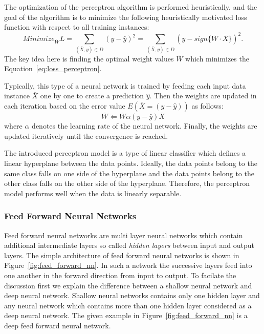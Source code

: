 The optimization of the perceptron algorithm is performed heuristically, and the goal of the algorithm is to minimize the following heuristically motivated loss function with respect to all training instances:
\begin{equation}
    Minimize_{\overline{W}} L=\sum\limits_{(\overline{X},y) \in D}(y-\hat{y})^2 = \sum\limits_{(\overline{X},y) \in D}(y-sign\{\overline{W}\cdot\overline{X}\})^2 .
    \label{eq:loss_perceptron}
\end{equation}
The key idea here is finding the optimal weight values $\overline{W}$ which minimizes the Equation~\ref{eq:loss_perceptron}. 


Typically, this type of a neural network is trained by feeding each input data instance $\overline{X}$ one by one to create a prediction $\hat{y}$. Then the weights are updated in each iteration based on the error value $E(\overline{X} = (y-\hat{y}))$ as follows:
\begin{equation}
    \overline{W} \Leftarrow \overline{W} \alpha (y-\hat{y})\overline{X}
\end{equation}
where $\alpha$ denotes the learning rate of the neural network. Finally, the weights are updated iteratively until the convergence is reached. 

The introduced perceptron model is a type of linear classifier which defines a linear hyperplane between the data points. Ideally, the data points belong to the same class falls on one side of the hyperplane and the data points belong to the other class falls on the other side of the hyperplane. Therefore, the perceptron model performs well when the data is linearly separable.
\subsubsection{Feed Forward Neural Networks}
Feed forward neural networks are multi layer neural networks which contain additional intermediate layers so called \textit{hidden layers} between input and output layers. The simple architecture of feed forward neural networks is shown in Figure~\ref{fig:feed_forward_nn}.
In such a network the successive layers feed into one another in the forward direction from input to output. To facilate the discussion first we explain the difference between a shallow neural network and deep neural network. Shallow neural networks contains only one hidden layer and any neural network which contains more than one hidden layer considered as a deep neural network. The given example in Figure~\ref{fig:feed_forward_nn} is 
a deep feed forward neural network.

